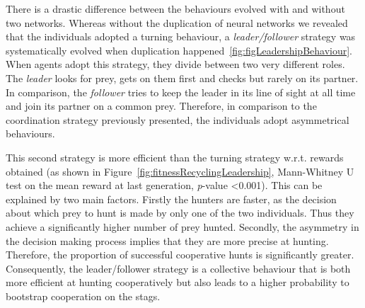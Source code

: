     There is a drastic difference between the behaviours evolved with and without two networks. Whereas without the duplication of neural networks we revealed that the individuals adopted a turning behaviour, a \emph{leader/follower} strategy was systematically evolved when duplication happened~\ref{fig:figLeadershipBehaviour}. When agents adopt this strategy, they divide between two very different roles. The \emph{leader} looks for prey, gets on them first and checks but rarely on its partner. In comparison, the \emph{follower} tries to keep the leader in its line of sight at all time and join its partner on a common prey. Therefore, in comparison to the coordination strategy previously presented, the individuals adopt asymmetrical behaviours. 


    This second strategy is more efficient than the turning strategy w.r.t. rewards obtained (as shown in Figure~\ref{fig:fitnessRecyclingLeadership}, Mann-Whitney U test on the mean reward at last generation, {\em p}-value \textless 0.001). This can be explained by two main factors. Firstly the hunters are faster, as the decision about which prey to hunt is made by only one of the two individuals. Thus they achieve a significantly higher number of prey hunted. Secondly, the asymmetry in the decision making process implies that they are more precise at hunting. Therefore, the proportion of successful cooperative hunts is significantly greater. Consequently, the leader/follower strategy is a collective behaviour that is both more efficient at hunting cooperatively but also leads to a higher probability to bootstrap cooperation on the stags.


